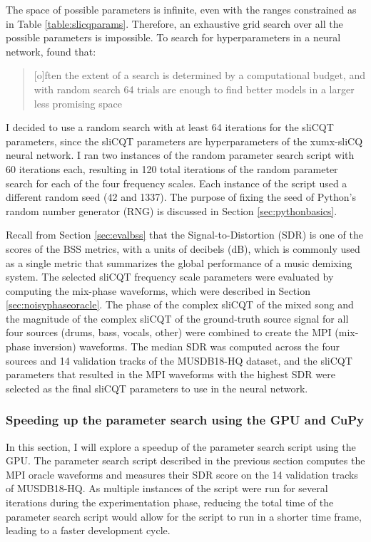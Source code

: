\documentclass[report.tex]{subfiles}
\begin{document}
The space of possible parameters is infinite, even with the ranges constrained as in Table \ref{table:slicqparams}. Therefore, an exhaustive grid search over all the possible parameters is impossible. To search for hyperparameters in a neural network, \textcite{randomgrid} found that:

\begin{quote}
	[o]ften the extent of a search is determined by a computational budget, and with random search 64 trials are enough to find better models in a larger less promising space \parencite[293]{randomgrid}
\end{quote}

I decided to use a random search with at least 64 iterations for the sliCQT parameters, since the sliCQT parameters are hyperparameters of the xumx-sliCQ neural network. I ran two instances of the random parameter search script with 60 iterations each, resulting in 120 total iterations of the random parameter search for each of the four frequency scales. Each instance of the script used a different random seed (42 and 1337). The purpose of fixing the seed of Python's random number generator (RNG) is discussed in Section \ref{sec:pythonbasics}.

Recall from Section \ref{sec:evalbss} that the Signal-to-Distortion (SDR) is one of the scores of the BSS metrics, with a units of decibels (dB), which is commonly used as a single metric that summarizes the global performance of a music demixing system. The selected sliCQT frequency scale parameters were evaluated by computing the mix-phase waveforms, which were described in Section \ref{sec:noisyphaseoracle}. The phase of the complex sliCQT of the mixed song and the magnitude of the complex sliCQT of the ground-truth source signal for all four sources (drums, bass, vocals, other) were combined to create the MPI (mix-phase inversion) waveforms. The median SDR was computed across the four sources and 14 validation tracks of the MUSDB18-HQ dataset, and the sliCQT parameters that resulted in the MPI waveforms with the highest SDR were selected as the final sliCQT parameters to use in the neural network.

\subsubsection{Speeding up the parameter search using the GPU and CuPy}
\label{sec:fasterbsscupy}

In this section, I will explore a speedup of the parameter search script using the GPU. The parameter search script described in the previous section computes the MPI oracle waveforms and measures their SDR score on the 14 validation tracks of MUSDB18-HQ. As multiple instances of the script were run for several iterations during the experimentation phase, reducing the total time of the parameter search script would allow for the script to run in a shorter time frame, leading to a faster development cycle.
\end{document}
